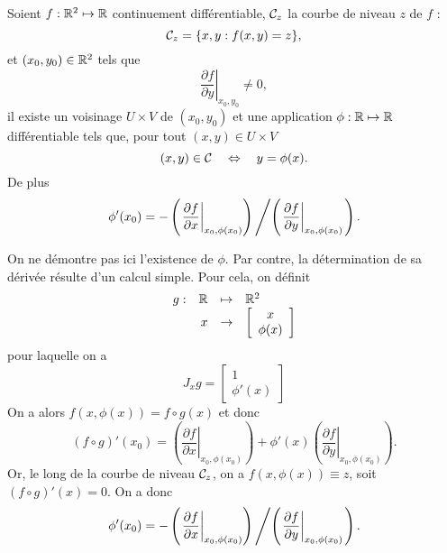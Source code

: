 \begin{theorem} \label{thm:fonctionImplicite}
  Soient $f : \mathbb{R}^2 \mapsto \mathbb{R}$ continuement différentiable, $\mathcal{C}_z$ la courbe de niveau $z$ de $f$ :
  $$
  \mathcal{C}_z = \{x, y: f(x, y) = z\},
  $$
  et $(x_0, y_0) \in \mathbb{R}^2$ tels que 
  $$
  \left.\frac{\partial f}{\partial y}\right|_{x_0, y_0} \neq 0,
  $$
  il existe un voisinage $U \times V$ de $(x_0, y_0)$ et une application $\phi : \mathbb{R} \mapsto \mathbb{R}$ différentiable tels que, pour tout $(x, y) \in U \times V$
  $$
  (x, y) \in \mathcal{C} \quad \Leftrightarrow \quad y = \phi(x).
  $$
  De plus
  $$
  \phi'(x_0) = - \left( \left. \frac{\partial f}{\partial x}\right|_{x_0, \phi(x_0)} \right) \left/ \left( \left. \frac{\partial f}{\partial y}\right|_{x_0, \phi(x_0)} \right. \right).
  $$
\end{theorem}

\proof [partielle]
On ne démontre pas ici l'existence de $\phi$. Par contre, la détermination de sa dérivée résulte d'un calcul simple. Pour cela, on définit
$$
\begin{array}{rrcl}
  g : & \mathbb{R} & \mapsto & \mathbb{R}^2 \\
  & x & \to & \left[\begin{array}{c} x \\ \phi(x) \end{array}\right]
\end{array}
$$
pour laquelle on a
$$
J_x g = \left[\begin{array}{c} 1 \\ \phi'(x) \end{array}\right]
$$
On a alors $f(x, \phi(x))= f \circ g (x)$ et donc
$$
(f \circ g)'(x_0) = \left( \left. \frac{\partial f}{\partial x}\right|_{x_0, \phi(x_0)} \right) + \phi'(x) \left( \left. \frac{\partial f}{\partial y}\right|_{x_0, \phi(x_0)} \right).
$$
Or, le long de la courbe de niveau $\mathcal{C}_z$, on a $f(x, \phi(x)) \equiv z$, soit $(f \circ g)'(x) = 0$. On a donc
$$
\phi'(x_0) = - \left( \left. \frac{\partial f}{\partial x}\right|_{x_0, \phi(x_0)} \right) \left/ \left( \left. \frac{\partial f}{\partial y}\right|_{x_0, \phi(x_0)} \right. \right).
$$
\eproof


